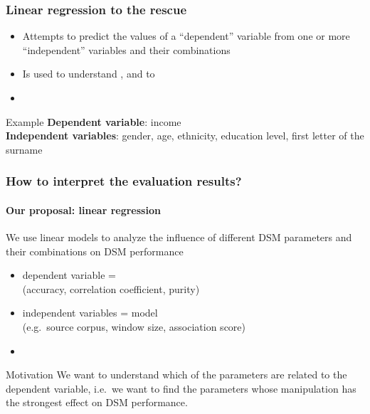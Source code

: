 \documentclass[t]{beamer} %
\begin{document}
\begin{frame}
  \frametitle{Linear regression to the rescue}

  \begin{itemize}
  \item Attempts to predict the values of a ``dependent'' variable from one or more ``independent'' variables and their combinations
  \item Is used to understand , and to 
  \item[]
  \end{itemize}

  \begin{block}{Example}
    \textbf{Dependent variable}: income \\
    \textbf{Independent variables}: gender, age, ethnicity, education level, first letter of the surname 
  \end{block}
\end{frame}
 
\begin{frame}
  \frametitle{How to interpret the evaluation results?}
  \framesubtitle{Our proposal: linear regression}

  We use linear models to analyze the influence of different DSM parameters and their combinations on DSM performance
  \begin{itemize}
  \item dependent variable = \\
    (accuracy, correlation coefficient, purity)
  \item independent variables = model \\
    (e.g.\ source corpus, window size, association score)
  \item[]
  \end{itemize}
  
  \begin{block}{Motivation}
    We want to understand which of the parameters are related to the dependent variable, i.e.\ we want to find the parameters whose manipulation has the strongest effect on DSM performance.
  \end{block}
\end{frame}
 
\end{document}

